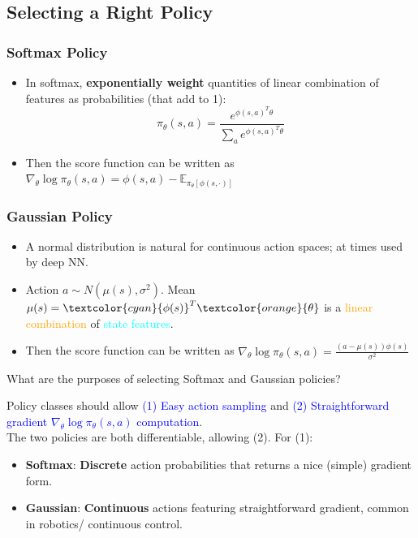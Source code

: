 \documentclass{article}
\begin{document}
\subsection{Selecting a Right Policy}

\subsubsection{Softmax Policy}
\begin{itemize}
\item In softmax, \textbf{exponentially weight} quantities of linear combination of features as probabilities (that add to 1):
    \begin{equation*}
        \pi_{\theta}(s, a) = \frac{e^{\phi (s, a)^{T} \theta}}{\sum_{a} e^{\phi (s, a)^{T} \theta}}
    \end{equation*}
\item Then the score function can be written as 
    $\nabla_{\theta} \log \pi_{\theta}(s, a) = \phi(s, a) - \mathbb{E}_{\pi_{\theta} [ \phi(s, \cdot) ]}$
\end{itemize}

\subsubsection{Gaussian Policy}
\begin{itemize}
\item A normal distribution is natural for continuous action spaces; at times used by deep NN.
\item Action $a \sim N(\mu(s), \sigma^2)$. Mean $\mu(s) = \textcolor{cyan}{\phi(s)}^{T} \textcolor{orange}{\theta}$ is a \textcolor{orange}{linear combination} of \textcolor{cyan}{state features}. 
\item Then the score function can be written as $\nabla_{\theta} \log \pi_{\theta}(s, a) = \frac{(a - \mu(s)) \phi(s)}{\sigma^2} $
\end{itemize}

\begin{hintbox}
    What are the purposes of selecting Softmax and Gaussian policies?
    \begin{prfbox}
        Policy classes should allow \textcolor{blue}{(1) Easy action sampling} and \textcolor{blue}{(2) Straightforward gradient $\nabla_{\theta} \log \pi_{\theta}(s, a)$ computation}.
        \\The two policies are both differentiable, allowing (2). For (1):
        \begin{itemize}
        \item \textbf{Softmax}: \textbf{Discrete} action probabilities that returns a nice (simple) gradient form.
        \item \textbf{Gaussian}: \textbf{Continuous} actions featuring straightforward gradient, common in robotics/ continuous control. 
        \end{itemize}
    \end{prfbox}
\end{hintbox}
\end{document}
